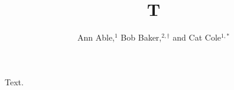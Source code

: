 \documentclass[aps]{revtex4}
\begin{document}
\title{T}
\author{Ann Able,$^{1}$ Bob Baker,$^{2,\dag}$ and Cat Cole$^{1,\ast}$}
\maketitle
Text.
\end{document}
